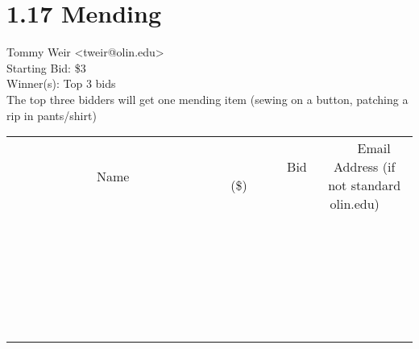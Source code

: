 \documentclass[11pt]{article}
\begin{document}
					\section*{1.17 Mending}
					Tommy Weir <tweir@olin.edu> \\
					Starting Bid: \$3 \\
					Winner(s): Top 3 bids \\
					The top three bidders will get one mending item (sewing on a button, patching a rip in pants/shirt) \\
					[6ex]
					\begin{tabular}{c c c}
						~~~~~~~~~~~~~Name~~~~~~~~~~~~~ & ~~~~~~~~~Bid (\$)~~~~~~~~~ & ~~~Email Address (if not standard olin.edu)~~~ \\
				
 & & \\
\hline
 & & \\
\hline
 & & \\
\hline
 & & \\
\hline
 & & \\
\hline
 & & \\
\hline
 & & \\
\hline
 & & \\
\hline
 & & \\
\hline
 & & \\
\hline
 & & \\
\hline
 & & \\
\hline
 & & \\
\hline
 & & \\
\hline
 & & \\
\hline
 & & \\
\hline
 & & \\
\hline
 & & \\
\hline
 & & \\
\hline
 & & \\
\hline
 & & \\
\hline
 & & \\
\hline
 & & \\
\hline
 & & \\
\hline
 & & \\
\hline
 & & \\
\hline
					\end{tabular}
					\clearpage
				
\end{document}
